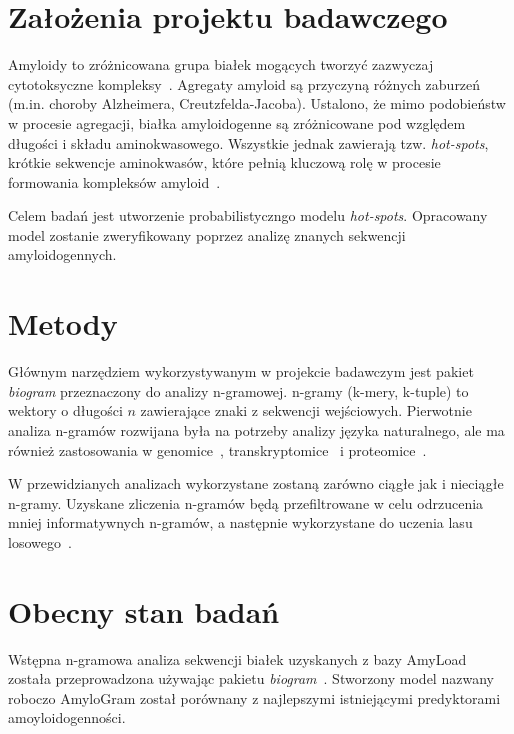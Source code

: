 \documentclass{article}
\author{Michał Burdukiewicz, Przemysław Gagat}
\title{Predykcja białek amyloidogennych \linebreak \vskip{} \large{Projekt badawczy Doktoranckiego Koła Naukowego Bioinformatyki}}
\date{}
\begin{document}
\maketitle

\section{Założenia projektu badawczego}

Amyloidy to zróżnicowana grupa białek mogących tworzyć zazwyczaj cytotoksyczne kompleksy~\citep{fandrich_oligomeric_2012}. Agregaty amyloid są przyczyną różnych zaburzeń (m.in. choroby Alzheimera, Creutzfelda-Jacoba). Ustalono, że mimo podobieństw w procesie agregacji, białka amyloidogenne są zróżnicowane pod względem długości i składu aminokwasowego. Wszystkie jednak zawierają tzw. \textit{hot-spots}, krótkie sekwencje aminokwasów, które pełnią kluczową rolę w procesie formowania kompleksów amyloid~\citep{breydo_structural_2015}.

Celem badań jest utworzenie probabilistyczngo modelu \textit{hot-spots}. Opracowany model zostanie zweryfikowany poprzez analizę znanych sekwencji amyloidogennych.

\section{Metody}

Głównym narzędziem wykorzystywanym w projekcie badawczym jest pakiet \textit{biogram} przeznaczony do analizy n-gramowej. n-gramy (k-mery, k-tuple) to wektory o długości $n$ zawierające znaki z sekwencji wejściowych. Pierwotnie analiza n-gramów rozwijana była na potrzeby analizy języka naturalnego, ale ma również zastosowania w genomice~\citep{fang2011}, transkryptomice~\citep{wang2014} i proteomice~\citep{guo2014}. 

W przewidzianych analizach wykorzystane zostaną zarówno ciągłe jak i nieciągłe n-gramy. Uzyskane zliczenia n-gramów będą przefiltrowane w celu odrzucenia mniej informatywnych n-gramów, a następnie wykorzystane do uczenia lasu losowego~\citep{liaw_classification_2002}.

\section{Obecny stan badań}

Wstępna n-gramowa analiza sekwencji białek uzyskanych z bazy AmyLoad\cite{wozniak_amyload:_2015} została przeprowadzona używając pakietu \textit{biogram}~\citep{burdukiewicz}. Stworzony model nazwany roboczo AmyloGram został porównany z najlepszymi istniejącymi predyktorami amoyloidogenności.
\end{document}
